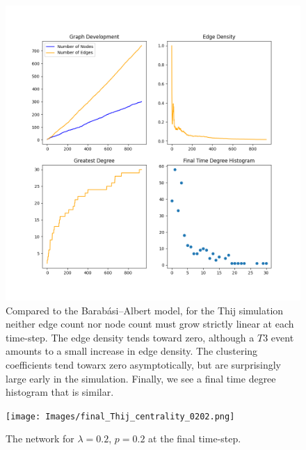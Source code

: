 \begin{figure}[h!]
    \includegraphics[width=14cm]{Images/twitter_sim_stats_3_0.2_0.2.png}
    \centering
    \caption{Compared to the Barabási–Albert model, for the Thij simulation neither edge count nor node
     count must grow strictly linear at each time-step. The edge density tends toward
     zero, although a $T3$ event amounts to a small increase in edge density. The clustering 
     coefficients tend towarx zero asymptotically, but are surprisingly large early in the simulation. Finally, we 
    see a final time degree histogram that is similar.}
\end{figure}

\begin{figure}[h!]
    \texttt{[image: Images/final\_Thij\_centrality\_0202.png]}
    \centering
    \caption{The network for $\lambda=0.2$, $p=0.2$ at the final time-step.}
\end{figure}

\clearpage

